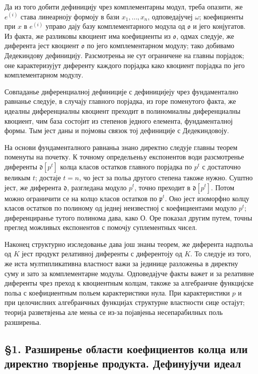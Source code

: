 ﻿\documentclass[11pt]{article}
\begin{document}
Да из того добити дефиницију чрез комплементарны модул, треба опазити, же \(e^{(i)}\) става линеарноју формоју в бази \(x_1,\ldots,x_n\), одповедајучеј \(\omega\); коефициенты при \(x\) в \(e^{(i)}\) управо дају базу комплементарного модула од \(\mathfrak o\) и јего конјугатов. Из факта, же разликовы квоциент има коефициенты из \(\mathfrak o\), одмах следује, же диферента јест квоциент \(\mathfrak o\) по јего комплементарном модулу; тако добивамо Дедекиндову дефиницију. Разсмотреньа не сут ограничене на главны порјадок; оне карактеризујут диференту каждого порјадка како квоциент порјадка по јего комплементарном модулу.

Совпаданье диференциалној дефиниције с дефиницијеју чрез фундаментално равнанье следује, в случају главного порјадка, из горе поменутого факта, же идеалны диференциалны квоциент преходит в полиномиалны диференциалны квоциент, чим база состојит из степенов једного елемента, фундаменталној формы. Тым јест даны и појмовы связок тој дефиниције с Дедекиндовоју.

На основи фундаменталного равнаньа знано директно следује главны теорем поменуты на почетку. К точному определьеньу експонентов води разсмотренье диференты \(\mathfrak d[p^t]\) колца класов остатков главного порјадка по \(p^t\) с достаточно великым \(t\); достаје \(t=n\), чо јест за польа другого степена такоже нужно. Суштно јест, же диферента \(\mathfrak d\), разгледана модуло \(p^t\), точно преходит в \(\mathfrak d[p^t]\). Потом можно ограничити се на колцо класов остатков по \(\mathfrak p^t\). Оно јест изоморфно колцу класов остатков по полиному од једнеј неизвестној с коефициентами модуло \(p^t\); диференциранье тутого полинома дава, како О. Оре показал другим путем, точны преглед можливых експонентов с помочју суплементных чисел.

Наконец структурно изследованье дава још знаны теорем, же диферента надпольа од \(K\) јест продукт релативној диференты с диферентоју од \(K\). То следује из того, же иста мултипликативна властност важи за јединице разложеньа в директну суму и зато за комплементарне модулы. Одповедајуче факты важет и за релативне диференты чрез преход к квоциентным колцам, такоже за алгебраичне функцијске польа с коефициентным польем карактеристики нула. При карактеристики \(p\) и при целочислних алгебраичных функцијах структурне властности сице остајут; теорија разветвјеньа але меньа се из-за појавјеньа несепарабилных поль разширеньа.

\subsection*{§1. Разширенье области коефициентов колца или директно творјенье продукта. Дефинујучи идеал}
\end{document}
